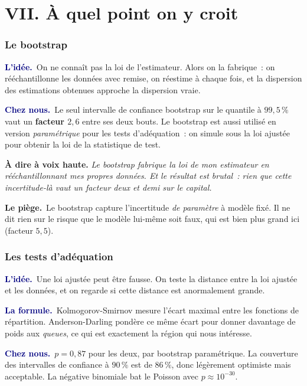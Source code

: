 \documentclass[11pt,a4paper]{article}
\newcommand{\lidee}[1]{\smallskip\noindent\textcolor{navy}{\textbf{L'idée.}}\ #1\par}
\newcommand{\laformule}[1]{\smallskip\noindent\textcolor{navy}{\textbf{La formule.}}\ #1\par}
\newcommand{\cheznous}[1]{\smallskip\noindent\textcolor{navy}{\textbf{Chez nous.}}\ #1\par}
\newcommand{\lepiege}[1]{\smallskip\noindent\textcolor{accent}{\textbf{Le piège.}}\ #1\par}
\newcommand{\laphrase}[1]{\begin{phrasebox}\textbf{À dire à voix haute.} \emph{#1}\end{phrasebox}}
\begin{document}
\part*{VII. À quel point on y croit}

\section{Le bootstrap}

\lidee{On ne connaît pas la loi de l'estimateur. Alors on la fabrique~: on rééchantillonne
les données avec remise, on réestime à chaque fois, et la dispersion des estimations
obtenues approche la dispersion vraie.}

\cheznous{Le seul intervalle de confiance bootstrap sur le quantile à $99{,}5\,\%$ vaut un
\textbf{facteur $2{,}6$} entre ses deux bouts. Le bootstrap est aussi utilisé en version
\emph{paramétrique} pour les tests d'adéquation~: on simule sous la loi ajustée pour obtenir
la loi de la statistique de test.}

\laphrase{Le bootstrap fabrique la loi de mon estimateur en rééchantillonnant mes propres
données. Et le résultat est brutal~: rien que cette incertitude-là vaut un facteur deux et
demi sur le capital.}

\lepiege{Le bootstrap capture l'incertitude \emph{de paramètre} à modèle fixé. Il ne dit
rien sur le risque que le modèle lui-même soit faux, qui est bien plus grand ici (facteur
$5{,}5$).}

\section{Les tests d'adéquation}

\lidee{Une loi ajustée peut être fausse. On teste la distance entre la loi ajustée et les
données, et on regarde si cette distance est anormalement grande.}

\laformule{Kolmogorov-Smirnov mesure l'écart maximal entre les fonctions de répartition.
Anderson-Darling pondère ce même écart pour donner davantage de poids aux \emph{queues}, ce
qui est exactement la région qui nous intéresse.}

\cheznous{$p=0{,}87$ pour les deux, par bootstrap paramétrique. La couverture des
intervalles de confiance à $90\,\%$ est de $86\,\%$, donc légèrement optimiste mais
acceptable. La négative binomiale bat le Poisson avec $p\approx10^{-30}$.}
\end{document}
